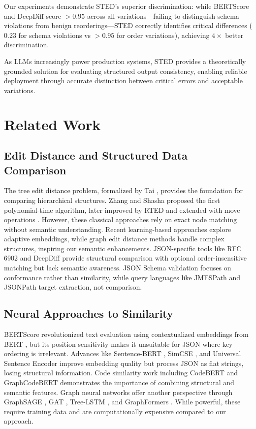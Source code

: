 \documentclass{article}
\begin{document}
Our experiments demonstrate STED's superior discrimination: while BERTScore and DeepDiff score $>0.95$ across all variations---failing to distinguish schema violations from benign reorderings---STED correctly identifies critical differences ($0.23$ for schema violations vs $>0.95$ for order variations), achieving $4\times$ better discrimination.

As LLMs increasingly power production systems, STED provides a theoretically grounded solution for evaluating structured output consistency, enabling reliable deployment through accurate distinction between critical errors and acceptable variations.
\vspace{-3mm}
\section{Related Work}
\vspace{-3mm}
\subsection{Edit Distance and Structured Data Comparison}
The tree edit distance problem, formalized by Tai \cite{Tai1979}, provides the foundation for comparing hierarchical structures. Zhang and Shasha \cite{Zhang1989} proposed the first polynomial-time algorithm, later improved by RTED \cite{Pawlik2011} and extended with move operations \cite{Chawathe1996}. However, these classical approaches rely on exact node matching without semantic understanding. Recent learning-based approaches \cite{paassen2018tree, paassen2022revisiting} explore adaptive embeddings, while graph edit distance methods \cite{jain2024graph, piao2023computing} handle complex structures, inspiring our semantic enhancements.
JSON-specific tools like RFC 6902 \cite{RFC6902} and DeepDiff \cite{seperman} provide structural comparison with optional order-insensitive matching but lack semantic awareness. JSON Schema validation \cite{Wright2022} focuses on conformance rather than similarity, while query languages like JMESPath \cite{JMESPath2014} and JSONPath \cite{Gessner2007} target extraction, not comparison.
\subsection{Neural Approaches to Similarity}
BERTScore \cite{Zhang2020} revolutionized text evaluation using contextualized embeddings from BERT \cite{Devlin2019}, but its position sensitivity makes it unsuitable for JSON where key ordering is irrelevant. Advances like Sentence-BERT \cite{Reimers2019}, SimCSE \cite{Gao2021}, and Universal Sentence Encoder \cite{Cer2018} improve embedding quality but process JSON as flat strings, losing structural information. Code similarity work including CodeBERT \cite{Feng2020} and GraphCodeBERT \cite{Guo2021} demonstrates the importance of combining structural and semantic features. Graph neural networks offer another perspective through GraphSAGE \cite{Hamilton2017}, GAT \cite{Velickovic2018}, Tree-LSTM \cite{Tai2015}, and GraphFormers \cite{Yang2021}. While powerful, these require training data and are computationally expensive compared to our approach.
\end{document}
